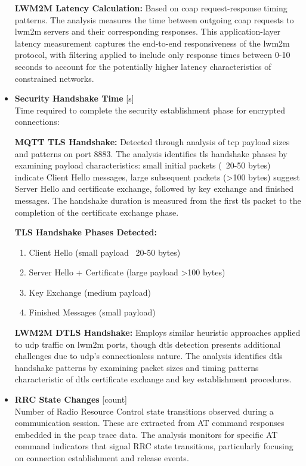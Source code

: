 \documentclass[12pt, english, openany]{book}
\begin{document}
\begin{itemize}
          \textbf{LWM2M Latency Calculation:} Based on \gls{coap} request-response timing patterns. The analysis measures the time between outgoing \gls{coap} requests to \gls{lwm2m} servers and their corresponding responses. This application-layer latency measurement captures the end-to-end responsiveness of the \gls{lwm2m} protocol, with filtering applied to include only response times between 0-10 seconds to account for the potentially higher latency characteristics of constrained networks.

    \item \textbf{Security Handshake Time} \hfill [s] \\
          Time required to complete the security establishment phase for encrypted connections:

          \textbf{MQTT TLS Handshake:} Detected through analysis of \gls{tcp} payload sizes and patterns on port 8883. The analysis identifies \gls{tls} handshake phases by examining payload characteristics: small initial packets (~20-50 bytes) indicate Client Hello messages, large subsequent packets (>100 bytes) suggest Server Hello and certificate exchange, followed by key exchange and finished messages. The handshake duration is measured from the first \gls{tls} packet to the completion of the certificate exchange phase.

          \textbf{TLS Handshake Phases Detected:}
          \begin{enumerate}
              \item Client Hello (small payload ~20-50 bytes)
              \item Server Hello + Certificate (large payload >100 bytes)
              \item Key Exchange (medium payload)
              \item Finished Messages (small payload)
          \end{enumerate}

          \textbf{LWM2M DTLS Handshake:} Employs similar heuristic approaches applied to \gls{udp} traffic on \gls{lwm2m} ports, though \gls{dtls} detection presents additional challenges due to \gls{udp}'s connectionless nature. The analysis identifies \gls{dtls} handshake patterns by examining packet sizes and timing patterns characteristic of \gls{dtls} certificate exchange and key establishment procedures.

    \item \textbf{RRC State Changes} \hfill [count] \\
          Number of Radio Resource Control state transitions observed during a communication session. These are extracted from AT command responses embedded in the \gls{pcap} trace data. The analysis monitors for specific AT command indicators that signal RRC state transitions, particularly focusing on connection establishment and release events.


\end{itemize}
\end{document}
